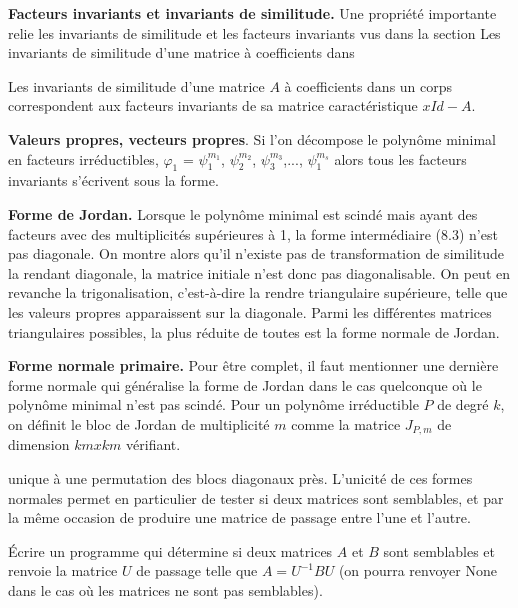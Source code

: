 \begin{flushleft}
\textbf{Facteurs invariants et invariants de similitude.}  Une propriété importante relie les invariants de similitude et les facteurs invariants vus dans la section  Les invariants de similitude d’une matrice  à coefficients dans
\begin{theorem}
Les invariants de similitude d’une matrice $A$ à coefficients dans un corps correspondent aux facteurs invariants de sa matrice caractéristique $xId - A$.
\end{theorem}
\end{flushleft}
\begin{flushright}
\textbf{Valeurs propres, vecteurs propres}. Si l’on décompose le polynôme minimal en facteurs irréductibles, 
$\varphi_{1}$ = $\psi_{1}^{m_{1}}$, $\psi_{2}^{m_{2}}$, $\psi_{3}^{m_{3}}$,..., $\psi_{1}^{m_{s}}$ alors tous les facteurs invariants s’écrivent sous la forme.
\end{flushright}
\begin{flushright}
\textbf{Forme de Jordan.} Lorsque le polynôme minimal est scindé mais ayant des
facteurs avec des multiplicités supérieures à 1, la forme intermédiaire (8.3) n’est
pas diagonale. On montre alors qu’il n’existe pas de transformation de similitude
la rendant diagonale, la matrice initiale n’est donc pas diagonalisable. On peut
en revanche la trigonalisation, c’est-à-dire la rendre triangulaire supérieure, telle que
les valeurs propres apparaissent sur la diagonale. Parmi les différentes matrices
triangulaires possibles, la plus réduite de toutes est la forme normale de Jordan.
\end{flushright}
\begin{flushright}
\textbf{Forme normale primaire.} Pour être complet, il faut mentionner une dernière
forme normale qui généralise la forme de Jordan dans le cas quelconque où le
polynôme minimal n’est pas scindé. Pour un polynôme irréductible $P$ de degré $k$,
on définit le bloc de Jordan de multiplicité $m$ comme la matrice $J_{P,m}$ de dimension
$km x km$ vérifiant.

unique à une permutation des blocs diagonaux près. L’unicité de ces formes normales permet en particulier de tester si deux matrices sont semblables, et par la même occasion de produire une matrice de
passage entre l’une et l’autre.
\begin{exercise}
Écrire un programme qui détermine si deux matrices $A$ et $B$ sont semblables et renvoie la matrice $U$ de passage telle que $A = U^{-1}BU$ (on pourra renvoyer None dans le cas où les matrices ne sont pas semblables).
\end{exercise}
\end{flushright}
